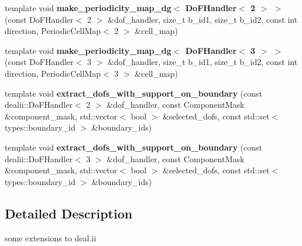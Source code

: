 \begin{DoxyCompactItemize}
\item 
\hypertarget{namespacenatrium_1_1DealIIExtensions_ae31f8793dc208deb99e34201a9c17779}{
template void {\bfseries make\_\-periodicity\_\-map\_\-dg$<$ DoFHandler$<$ 2 $>$ $>$} (const DoFHandler$<$ 2 $>$ \&dof\_\-handler, size\_\-t b\_\-id1, size\_\-t b\_\-id2, const int direction, PeriodicCellMap$<$ 2 $>$ \&cell\_\-map)}
\label{namespacenatrium_1_1DealIIExtensions_ae31f8793dc208deb99e34201a9c17779}

\item 
\hypertarget{namespacenatrium_1_1DealIIExtensions_a4d4a08bca6d3ef3833ba3a0107ea7fa8}{
template void {\bfseries make\_\-periodicity\_\-map\_\-dg$<$ DoFHandler$<$ 3 $>$ $>$} (const DoFHandler$<$ 3 $>$ \&dof\_\-handler, size\_\-t b\_\-id1, size\_\-t b\_\-id2, const int direction, PeriodicCellMap$<$ 3 $>$ \&cell\_\-map)}
\label{namespacenatrium_1_1DealIIExtensions_a4d4a08bca6d3ef3833ba3a0107ea7fa8}

\item 
\hypertarget{namespacenatrium_1_1DealIIExtensions_ae531bdf7ab145d71f306ec1d4a1cefb3}{
template void {\bfseries extract\_\-dofs\_\-with\_\-support\_\-on\_\-boundary} (const dealii::DoFHandler$<$ 2 $>$ \&dof\_\-handler, const ComponentMask \&component\_\-mask, std::vector$<$ bool $>$ \&selected\_\-dofs, const std::set$<$ types::boundary\_\-id $>$ \&boundary\_\-ids)}
\label{namespacenatrium_1_1DealIIExtensions_ae531bdf7ab145d71f306ec1d4a1cefb3}

\item 
\hypertarget{namespacenatrium_1_1DealIIExtensions_a157762b4a7d95c0f6b614f451d1dbd2d}{
template void {\bfseries extract\_\-dofs\_\-with\_\-support\_\-on\_\-boundary} (const dealii::DoFHandler$<$ 3 $>$ \&dof\_\-handler, const ComponentMask \&component\_\-mask, std::vector$<$ bool $>$ \&selected\_\-dofs, const std::set$<$ types::boundary\_\-id $>$ \&boundary\_\-ids)}
\label{namespacenatrium_1_1DealIIExtensions_a157762b4a7d95c0f6b614f451d1dbd2d}

\end{DoxyCompactItemize}


\subsection{Detailed Description}
some extensions to deal.ii 

